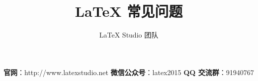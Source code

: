 \documentclass{latex-faq-cn-class}
\title{\LaTeX{} 常见问题}
\author{\LaTeX{} Studio 团队}
\begin{document}
  \maketitle
  
  
  
  
  
  
  
  
  
  
  
  
  
  
  
  
  
  \textbf{官网}：http://www.latexstudio.net \textbf{微信公众号}：latex2015
  \textbf{QQ 交流群}：91940767
  
\end{document}
